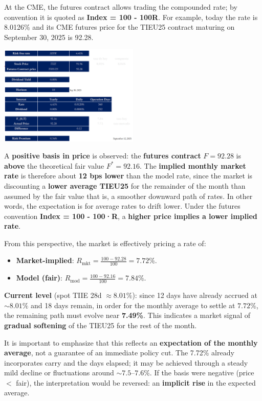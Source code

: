 \documentclass[10pt,a4paper]{article} %
\begin{document}
At the CME, the futures contract allows trading the compounded rate; by convention it is quoted as \textbf{Index = 100 - 100R}. For example, today the rate is 8.0126\% and its CME futures price for the TIEU25 contract maturing on September 30, 2025 is 92.28. 

\begin{center}
\includegraphics[width=0.5\textwidth]{figures/tiie.png}
\end{center}

A \textbf{positive basis in price} is observed: the \textbf{futures contract} $F=92.28$ is \textbf{above} the theoretical fair value $F^*=92.16$. The \textbf{implied monthly market rate} is therefore about \textbf{12 bps lower} than the model rate, since the market is discounting a \textbf{lower average TIEU25} for the remainder of the month than assumed by the fair value that is, a smoother downward path of rates. In other words, the expectation is for average rates to drift lower. Under the futures convention \textbf{Index = 100 - 100·R}, a \textbf{higher price implies a lower implied rate}. 

From this perspective, the market is effectively pricing a rate of:
\begin{itemize}
  \item \textbf{Market-implied}: $R_{\text{mkt}} = \tfrac{100-92.28}{100} = \mathbf{7.72\%}$.
  \item \textbf{Model (fair)}: $R_{\text{mod}} = \tfrac{100-92.16}{100} = \mathbf{7.84\%}$.
\end{itemize}

\textbf{Current level} (spot TIIE 28d $\approx 8.01\%$): since 12 days have already accrued at $\sim8.01\%$ and 18 days remain, in order for the monthly average to settle at $7.72\%$, the remaining path must evolve near \textbf{7.49\%}. This indicates a market signal of \textbf{gradual softening} of the TIEU25 for the rest of the month.

It is important to emphasize that this reflects an \textbf{expectation of the monthly average}, not a guarantee of an immediate policy cut. The 7.72\% already incorporates carry and the days elapsed; it may be achieved through a steady mild decline or fluctuations around $\sim7.5$--$7.6\%$. If the basis were negative (price $<$ fair), the interpretation would be reversed: an \textbf{implicit rise} in the expected average.
\end{document}
